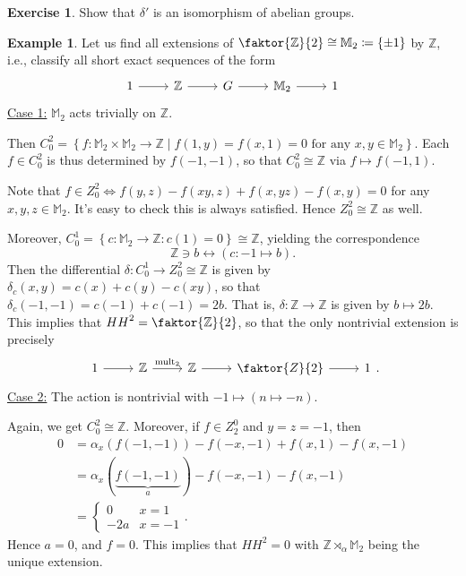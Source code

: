 \documentclass[10pt,letterpaper,cm]{nupset}
\theoremstyle{definition}
\newtheorem{exmp}[definition]{Example}
\theoremstyle{theorem}
\newtheorem{exercise}[definition]{Exercise}
\theoremstyle{remark}
\newcommand{\M}{\mathbb M}
\newcommand{\Z}{\mathbb Z}
\newcommand{\1}{\mathbf{1}}
\newcommand{\0}{\vec 0}
\DeclareMathOperator{\mult}{mult}
\begin{document}
\begin{exercise}
Show that $\delta '$ is an isomorphism of abelian groups.
\end{exercise}

\begin{exmp}
Let us find all extensions of $\faktor{\Z}{2}\cong \M_2 \coloneqq  \{\pm1\}$ by $\Z$, i.e., classify all short exact sequences of the form
\[
\begin{tikzcd}
1 \arrow[r] & \Z \arrow[r] & G \arrow[r] & \M_2 \arrow[r] & 1
\end{tikzcd}
\]
\underline{Case 1:} $\M_2$ acts trivially on $\Z$. 

Then $C^2_0 = \left\{f : \M_2 \times \M_2 \to \Z \mid f(1, y) = f(x, 1) = 0 \text{ for any } x,y \in \M_2 \right\}$. Each $f \in C^2_0$ is thus determined by $f(-1, -1)$, so that $C^2_0 \cong \Z$ via $f\mapsto f(-1, 1)$.

\medskip

 Note that $f\in Z^2_0 \iff f(y, z)-f(xy, z)+f(x, yz)-f(x, y) =0$ for any $x, y, z\in \M_2$. It's easy to check this is always satisfied. Hence $Z^2_0 \cong \Z$ as well. 

\medskip

 Moreover, $C^1_0 = \left\{c : \M_2 \to \Z : c(1) =0\right\} \cong \Z$, yielding the correspondence $$\Z \ni b \longleftrightarrow \left(c: {-1} \mapsto b\right).$$ Then the differential $\delta : C^1_0 \to Z^2_0\cong \Z$ is given by $\delta_c(x, y) = c(x)+c(y) -c(xy)$, so that $\delta_c({-1}, {-1}) = c({-1}) + c({-1}) = 2b$. That is, $\delta : \Z \to \Z$ is given by $b \mapsto 2b$. This implies that ${HH}^2 = \faktor{\Z}{2}$, so that the only nontrivial extension is precisely
\[
\begin{tikzcd}
1 \arrow[r] & \Z \arrow[r, "\mult_2"] & \Z \arrow[r] & \faktor{Z}{2} \arrow[r] & 1
\end{tikzcd}.
\]
\underline{Case 2:} The action is nontrivial with ${-1} \mapsto \left(n \mapsto {-n}\right)$. 

 Again, we get $C^2_0 \cong \Z$. Moreover, if $f\in Z_2^0$ and $y= z = {-1}$, then 
\begin{align*}
0 & = \alpha_x(f({-1}, {-1})) - f({-x}, {-1})+ f(x, 1)- f(x, {-1})
\\ & = \alpha_x(\underbrace{f({-1}, {-1})}_a) - f({-x}, {-1})- f(x, {-1}) 
\\ & =
\begin{cases}
0 & x =1 \\
{-2a} & x = {-1}
\end{cases}.
\end{align*}
Hence $a = 0$, and $f = 0$. This implies that ${HH}^2 = 0$ with $\Z \rtimes_{\alpha} \M_2$ being the unique extension. 
\end{exmp}
\end{document}
